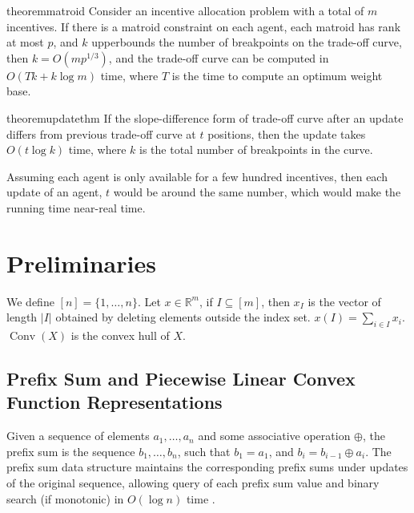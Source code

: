 \documentclass{article}
\newcommand{\R}{\mathbb{R}}
\begin{document}
\begin{restatable}{theorem}{matroid}
    \label{thm:matroid}
    Consider an incentive allocation problem with a total of $m$ incentives. 
    If there is a matroid constraint on each agent, each matroid has rank at most $p$, and $k$ upperbounds the number of breakpoints on the trade-off curve, then $k=O(mp^{1/3})$, and the trade-off curve can be computed in $O(Tk+k\log m)$ time, where $T$ is the time to compute an optimum weight base.
\end{restatable}



\begin{restatable}{theorem}{updatethm}
    \label{thm:update}
    If the slope-difference form of trade-off curve after an update differs from previous trade-off curve at $t$ positions, then the update takes $O(t\log k)$ time, where $k$ is the total number of breakpoints in the curve.
\end{restatable}

Assuming each agent is only available for a few hundred incentives, then each update of an agent, $t$ would be around the same number, which would make the running time near-real time.  

\section{Preliminaries}\label{sec:prelim}


We define $[n]=\{1,\ldots,n\}$. Let $x\in \R^m$, if $I\subseteq [m]$, then $x_{I}$ is the vector of length $|I|$ obtained by deleting elements outside the index set. $x(I) = \sum_{i\in I} x_i$. $\operatorname{Conv}(X)$ is the convex hull of $X$. 

\subsection{Prefix Sum and Piecewise Linear Convex Function Representations}
Given a sequence of elements $a_1,\ldots,a_n$ and some associative operation $\oplus$, the prefix sum is the sequence $b_1,\ldots,b_n$, such that $b_1=a_1$, and $b_i = b_{i-1} \oplus a_i$. The prefix sum data structure maintains the corresponding prefix sums under updates of the original sequence, allowing query of each prefix sum value and binary search (if monotonic) in $O(\log n)$ time \cite{blelloch1990}. 
\end{document}
